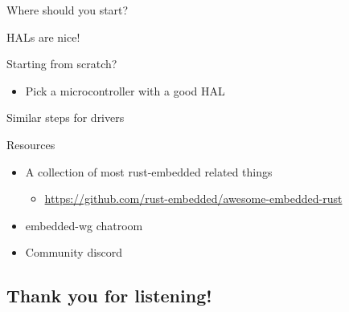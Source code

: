 \documentclass[aspectratio=169]{beamer}
\begin{document}
\begin{frame}{Where should you start?}
     {
        HALs are nice!

        Starting from scratch?
        \begin{itemize}
            \item{Pick a microcontroller with a good HAL}
        \end{itemize}
    }


     {
        Similar steps for drivers
    }
\end{frame}

\begin{frame}{Resources}
    \begin{itemize}
        \item A collection of most rust-embedded related things
            \begin{itemize}\item \url{https://github.com/rust-embedded/awesome-embedded-rust}\end{itemize}
        \item{embedded-wg chatroom}
        \item{Community discord}
    \end{itemize}

\end{frame}

\begin{frame}
    \section{Thank you for listening!}
\end{frame}
\end{document}
